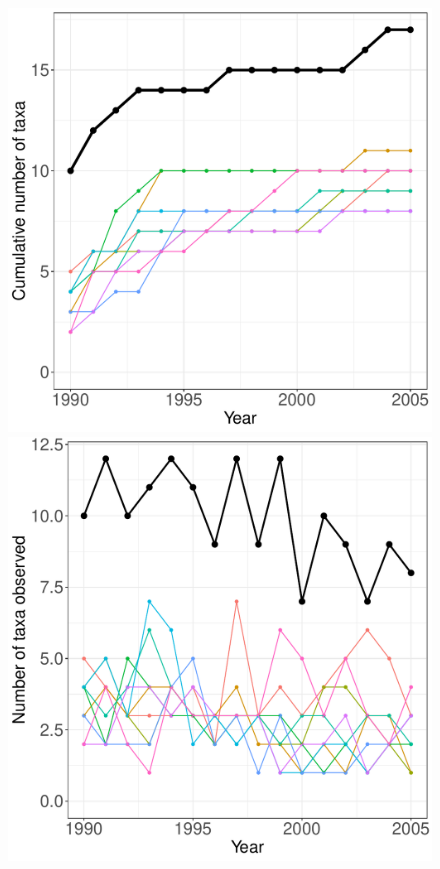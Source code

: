 \documentclass[11pt, oneside]{article}
\begin{document}
\begin{figure}[h!]
\centering
\includegraphics[scale = 0.4]{jrn-lizards-hope_species_accumulation_curve.pdf}
\includegraphics[scale = 0.4]{jrn-lizards-hope_num_taxa_over_time.pdf}

\end{figure}
\end{document}
